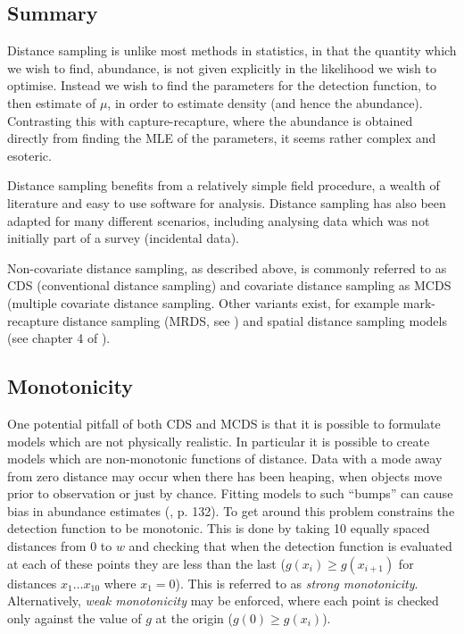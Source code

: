 \subsection{Summary}
Distance sampling is unlike most methods in statistics, in that the quantity which we wish to find, abundance, is not given explicitly in the likelihood we wish to optimise. Instead we wish to find the parameters for the detection function, to then estimate of $\mu$, in order to estimate density (and hence the abundance). Contrasting this with capture-recapture, where the abundance is obtained directly from finding the MLE of the parameters, it seems rather complex and esoteric. 

Distance sampling benefits from a relatively simple field procedure, a wealth of literature and easy to use software for analysis. Distance sampling has also been adapted for many different scenarios, including analysing data which was not initially part of a survey (incidental data).

Non-covariate distance sampling, as described above, is commonly referred to as CDS (conventional distance sampling) and covariate distance sampling as MCDS (multiple covariate distance sampling. Other variants exist, for example mark-recapture distance sampling (MRDS, see \cite{mrdspaper}) and spatial distance sampling models (see chapter 4 of \cite{ADS}).

\subsection{Monotonicity}
One potential pitfall of both CDS and MCDS is that  it is possible to formulate models which are not physically realistic. In particular it is possible to create models which are non-monotonic functions of distance. Data with a mode away from zero distance may occur when there has been heaping, when objects move prior to observation or just by chance. Fitting models to such ``bumps'' can cause bias in abundance estimates (\cite{IDS}, p. 132). To get around this problem  constrains the detection function to be monotonic. This is done by taking 10 equally spaced distances from $0$ to $w$ and checking that when the detection function is evaluated at each of these points they are less than the last ($g(x_i)\geq g(x_{i+1})$ for distances $x_1 \dots x_{10}$ where $x_1=0$). This is referred to as \textit{strong monotonicity}. Alternatively, \textit{weak monotonicity} may be enforced, where each point is checked only against the value of $g$ at the origin ($g(0)\geq g(x_i)$).


